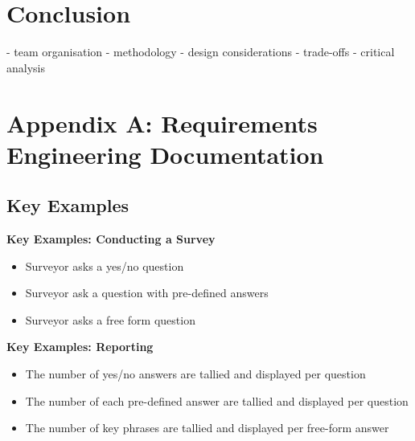 \documentclass[12pt]{witseiepaper}
\begin{document}
%
\section{Conclusion}

- team organisation
- methodology
- design considerations
- trade-offs
- critical analysis




%

\newpage
\newcommand{\summary}[1]{\addtocontents{toc}{#1\par}}
{}


\renewcommand{\bibname}{REFERENCES}
\renewcommand*{\bibfont}{\raggedright}




\newpage




\section{Appendix A: Requirements Engineering Documentation}

\subsection{Key Examples}

\textbf{Key Examples: Conducting a Survey}
\begin{itemize}
\item Surveyor asks a yes/no question 
\item Surveyor ask a question with pre-defined answers
\item Surveyor asks a free form question
\end{itemize}

\textbf{Key Examples: Reporting}
\begin{itemize}
\item The number of yes/no answers are tallied and displayed per question
\item The number of each pre-defined answer are tallied and displayed per question
\item The number of key phrases are tallied and displayed per free-form answer
\end{itemize}
\end{document}
